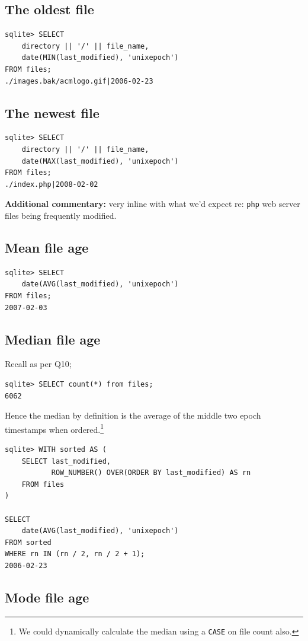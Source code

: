 \documentclass{article}
\begin{document}
\subsection*{The oldest file}
\begin{verbatim}
sqlite> SELECT 
    directory || '/' || file_name,
    date(MIN(last_modified), 'unixepoch')
FROM files;
./images.bak/acmlogo.gif|2006-02-23
\end{verbatim}
\subsection*{The newest file}
\begin{verbatim}
sqlite> SELECT 
    directory || '/' || file_name,
    date(MAX(last_modified), 'unixepoch')                   
FROM files;
./index.php|2008-02-02
\end{verbatim}
\textbf{Additional commentary:} very inline with what we'd expect re: \texttt{php} web server files being frequently modified.
\subsection*{Mean file age}
\begin{verbatim}
sqlite> SELECT 
    date(AVG(last_modified), 'unixepoch')
FROM files;
2007-02-03
\end{verbatim}

\newpage

\subsection*{Median file age}
Recall as per Q10; 

\begin{verbatim}
sqlite> SELECT count(*) from files;
6062
\end{verbatim}

Hence the median by definition is the average of the middle two epoch timestamps when ordered.\footnote{We could dynamically calculate the median using a \texttt{CASE} on file count also.}

\begin{verbatim}
sqlite> WITH sorted AS (
    SELECT last_modified,
           ROW_NUMBER() OVER(ORDER BY last_modified) AS rn
    FROM files
)

SELECT 
    date(AVG(last_modified), 'unixepoch')
FROM sorted
WHERE rn IN (rn / 2, rn / 2 + 1);
2006-02-23
\end{verbatim}

\subsection*{Mode file age}
\end{document}

